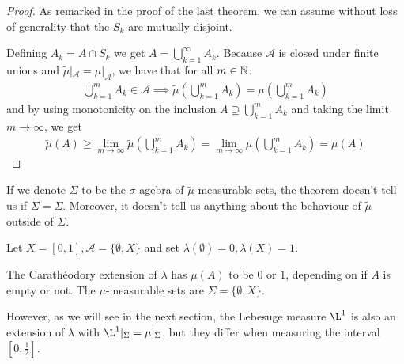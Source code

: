 \begin{proof}
  As remarked in the proof of the last theorem, we can assume without loss of generality that the $S_k$ are mutually disjoint.

  Defining $A_k = A \cap S_k$ we get $A = \bigcup_{k=1}^{\infty} A_k$.
  Because $\mathcal{A}$ is closed under finite unions and $\tilde{\mu}|_{\mathcal{A}} = \mu|_{\mathcal{A}}$, we have that for all $m \in \mathbb{N}$:
  \begin{align*}
      \bigcup_{k=1}^{m}A_k \in \mathcal{A} \implies
      \tilde{\mu}\left(
        \bigcup_{k=1}^{m}A_k
      \right)
      =
      \mu\left(
        \bigcup_{k=1}^{m}A_k
      \right)
  \end{align*}
  and by using monotonicity on the inclusion $A \supseteq \bigcup_{k=1}^{m}A_k$ and taking the limit $m \to \infty$,
  we get
  \begin{align*}
    \tilde{\mu}(A) 
    \geq 
    \lim_{m \to \infty} \tilde{\mu} \left(
      \bigcup_{k=1}^{m} A_k
    \right)
    =
    \lim_{m \to \infty} \mu \left(
      \bigcup_{k=1}^{m} A_k
    \right)
    =
    \mu(A)
  \end{align*}
\end{proof}

If we denote $\tilde{\Sigma}$ to be the $\sigma$-agebra of $\tilde{\mu}$-measurable sets, the theorem doesn't tell us if $\tilde{\Sigma} = \Sigma$.
Moreover, it doesn't tell us anything about the behaviour of $\tilde{\mu}$ outside of $\Sigma$.


\begin{ex}
  Let $X = [0,1], \mathcal{A} = \{\emptyset,X\}$ and set $\lambda(\emptyset) = 0, \lambda(X) = 1$.

  The Carathéodory extension of $\lambda$ has $\mu(A)$ to be $0$ or $1$, depending on if $A$ is empty or not.
  The $\mu$-measurable sets are $\Sigma = \{\emptyset,X\}$.


  However, as we will see in the next section, the Lebesuge measure $\L^{1}$ is also an extension of $\lambda$ with $\L^{1}|_{\Sigma} = \mu|_{\Sigma}$, but they differ when measuring the interval $[0,\tfrac{1}{2}]$.
\end{ex}
